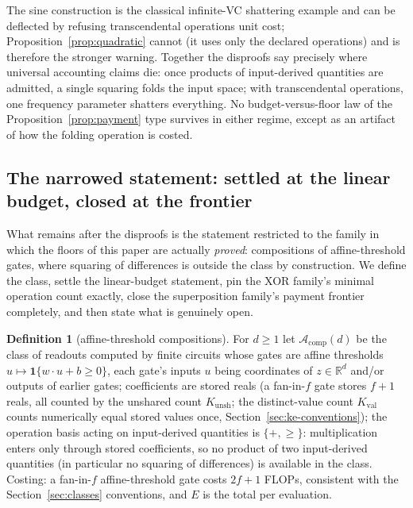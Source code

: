 \documentclass[twocolumn,10pt]{article}
\theoremstyle{definition}
\newtheorem{definition}[theorem]{Definition}
\theoremstyle{remark}
\newcommand{\R}{\mathbb{R}}
\newcommand{\cA}{\mathcal{A}}
\newcommand{\Kunsh}{K_{\mathrm{unsh}}}
\newcommand{\Kval}{K_{\mathrm{val}}}
\begin{document}
The sine construction is the classical infinite-VC shattering example
\cite{vapnik} and can be deflected by refusing transcendental
operations unit cost; Proposition~\ref{prop:quadratic} cannot (it
uses only the declared operations) and is therefore the stronger
warning. Together the disproofs say precisely where universal
accounting claims die: once products of input-derived quantities are
admitted, a single squaring folds the input space; with transcendental
operations, one frequency parameter shatters everything. No
budget-versus-floor law of the Proposition~\ref{prop:payment} type
survives in either regime, except as an artifact of how the folding
operation is costed.

\subsection{The narrowed statement: settled at the linear budget, closed
at the frontier}
\label{sec:narrowed}

What remains after the disproofs is the statement restricted to the
family in which the floors of this paper are actually \emph{proved}:
compositions of affine-threshold gates, where squaring of differences
is outside the class by construction. We define the class, settle the
linear-budget statement, pin the XOR family's minimal operation count
exactly, close the superposition family's payment frontier completely,
and then state what is genuinely open.

\begin{definition}[affine-threshold compositions]
\label{def:acomp}
For $d \ge 1$ let $\cA_{\mathrm{comp}}(d)$ be the class of readouts
computed by finite circuits whose gates are affine thresholds
$u \mapsto \mathbf 1\{w \cdot u + b \ge 0\}$, each gate's inputs $u$ being
coordinates of $z \in \R^d$ and/or outputs of earlier gates; coefficients
are stored reals (a fan-in-$f$ gate stores $f + 1$ reals, all counted
by the unshared count $\Kunsh$; the distinct-value count $\Kval$
counts numerically equal stored values once,
Section~\ref{sec:ke-conventions}); the
operation basis acting on input-derived quantities is $\{+, \ge\}$:
multiplication enters only through stored coefficients, so no product of
two input-derived quantities (in particular no squaring of differences)
is available in the class. Costing: a fan-in-$f$ affine-threshold gate
costs $2f + 1$ FLOPs, consistent with the Section~\ref{sec:classes}
conventions, and $E$ is the total per evaluation.
\end{definition}
\end{document}
